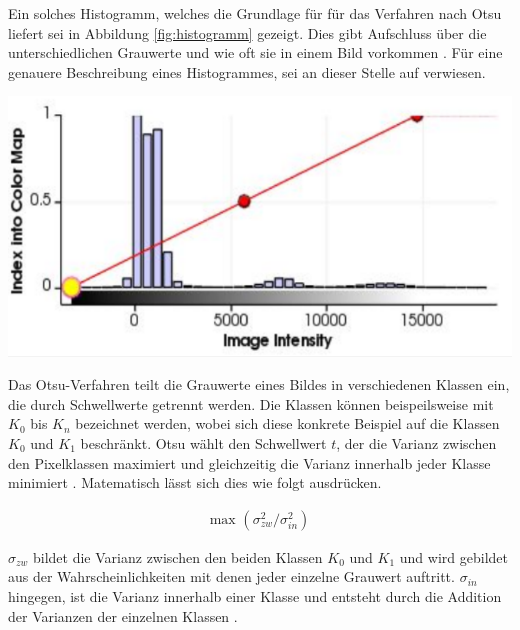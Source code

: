 \begin{minipage}{0.40\textwidth}
	Ein solches Histogramm, welches die Grundlage für für das Verfahren nach Otsu
	liefert sei in Abbildung \ref{fig:histogramm} gezeigt. Dies gibt Aufschluss über
	die unterschiedlichen Grauwerte und wie oft sie in einem Bild vorkommen \citep[vgl.][Seite264]{lehmann2013bildverarbeitung}.
	Für eine genauere Beschreibung eines Histogrammes, sei an dieser Stelle auf \citet[Seite42]{burger2009}
	verwiesen.
\end{minipage}
\hfill
\begin{minipage}{0.50\textwidth}
	\centering
	\includegraphics[width=1\textwidth]{img/histogramm.jpg}
	 \label{fig:histogramm}
\end{minipage}

Das Otsu-Verfahren teilt die Grauwerte eines Bildes in verschiedenen Klassen ein,
die durch Schwellwerte getrennt werden. Die Klassen können beispeilsweise mit
$K_{0}$ bis $K_{n}$ bezeichnet werden, wobei sich diese konkrete Beispiel auf die Klassen
$K_{0}$ und $K_{1}$ beschränkt. Otsu wählt den Schwellwert $t$, der die Varianz
zwischen den Pixelklassen maximiert und gleichzeitig die Varianz innerhalb jeder
Klasse minimiert \citep[vgl.][Seite264]{lehmann2013bildverarbeitung}.
Matematisch lässt sich dies wie folgt ausdrücken.

\begin{align}
	\text{max }(\sigma_{zw}^{2}/ \sigma_{in}^{2})
\end{align}

$\sigma_{zw}$ bildet die Varianz zwischen den beiden Klassen $K_{0}$ und $K_{1}$
und wird gebildet aus der Wahrscheinlichkeiten mit denen jeder einzelne Grauwert
auftritt. $\sigma_{in}$ hingegen, ist die Varianz innerhalb einer Klasse und entsteht durch die
Addition der Varianzen der einzelnen Klassen \citep[vgl.][Seite264]{lehmann2013bildverarbeitung}.

